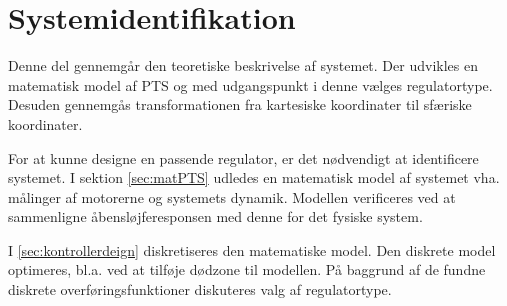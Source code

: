 \part{Systemidentifikation}
Denne del gennemgår den teoretiske beskrivelse af systemet.
Der udvikles en matematisk model af PTS og med udgangspunkt i denne vælges regulatortype.
Desuden gennemgås transformationen fra kartesiske koordinater til sfæriske koordinater.

For at kunne designe en passende regulator, er det nødvendigt at identificere systemet. 
I sektion \ref{sec:matPTS} udledes en matematisk model af systemet vha. målinger af motorerne og systemets dynamik. 
Modellen verificeres ved at sammenligne åbensløjferesponsen med denne for det fysiske system. 

I \ref{sec:kontrollerdeign} diskretiseres den matematiske model. Den diskrete model optimeres, bl.a. ved at tilføje dødzone til modellen. På baggrund af de fundne diskrete overføringsfunktioner diskuteres valg af regulatortype. 





%
